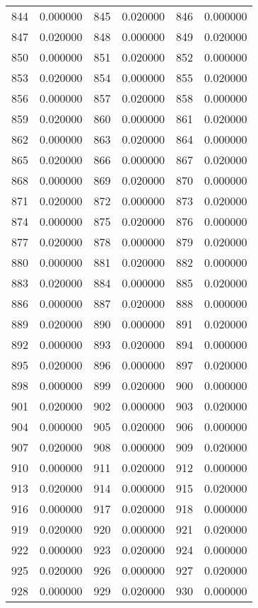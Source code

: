 \documentclass[12pt]{article}
\begin{document}
\begin{longtable}{@{}cc|cc|cc@{}}
844 & 0.000000 & 845 & 0.020000 & 846 & 0.000000 \\
847 & 0.020000 & 848 & 0.000000 & 849 & 0.020000 \\
850 & 0.000000 & 851 & 0.020000 & 852 & 0.000000 \\
853 & 0.020000 & 854 & 0.000000 & 855 & 0.020000 \\
856 & 0.000000 & 857 & 0.020000 & 858 & 0.000000 \\
859 & 0.020000 & 860 & 0.000000 & 861 & 0.020000 \\
862 & 0.000000 & 863 & 0.020000 & 864 & 0.000000 \\
865 & 0.020000 & 866 & 0.000000 & 867 & 0.020000 \\
868 & 0.000000 & 869 & 0.020000 & 870 & 0.000000 \\
871 & 0.020000 & 872 & 0.000000 & 873 & 0.020000 \\
874 & 0.000000 & 875 & 0.020000 & 876 & 0.000000 \\
877 & 0.020000 & 878 & 0.000000 & 879 & 0.020000 \\
880 & 0.000000 & 881 & 0.020000 & 882 & 0.000000 \\
883 & 0.020000 & 884 & 0.000000 & 885 & 0.020000 \\
886 & 0.000000 & 887 & 0.020000 & 888 & 0.000000 \\
889 & 0.020000 & 890 & 0.000000 & 891 & 0.020000 \\
892 & 0.000000 & 893 & 0.020000 & 894 & 0.000000 \\
895 & 0.020000 & 896 & 0.000000 & 897 & 0.020000 \\
898 & 0.000000 & 899 & 0.020000 & 900 & 0.000000 \\
901 & 0.020000 & 902 & 0.000000 & 903 & 0.020000 \\
904 & 0.000000 & 905 & 0.020000 & 906 & 0.000000 \\
907 & 0.020000 & 908 & 0.000000 & 909 & 0.020000 \\
910 & 0.000000 & 911 & 0.020000 & 912 & 0.000000 \\
913 & 0.020000 & 914 & 0.000000 & 915 & 0.020000 \\
916 & 0.000000 & 917 & 0.020000 & 918 & 0.000000 \\
919 & 0.020000 & 920 & 0.000000 & 921 & 0.020000 \\
922 & 0.000000 & 923 & 0.020000 & 924 & 0.000000 \\
925 & 0.020000 & 926 & 0.000000 & 927 & 0.020000 \\
928 & 0.000000 & 929 & 0.020000 & 930 & 0.000000 \\

\end{longtable}
\end{document}
